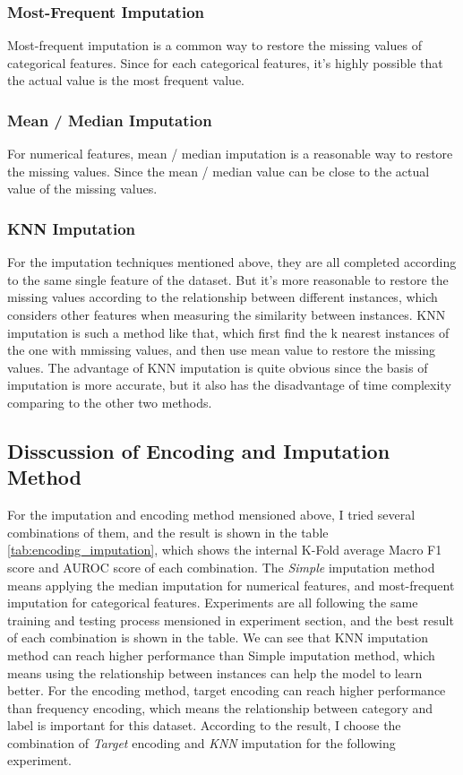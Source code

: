 \documentclass[a4paper, oneside, final, 12pt]{scrartcl} %
\begin{document}
\subsubsection{Most-Frequent Imputation}

Most-frequent imputation is a common way to restore the missing values of categorical features.
Since for each categorical features, it's highly possible that the actual value is the most frequent value.

\subsubsection{Mean / Median Imputation}

For numerical features, mean / median imputation is a reasonable way to restore the missing values.
Since the mean / median value can be close to the actual value of the missing values.

\subsubsection{KNN Imputation}

For the imputation techniques mentioned above, they are all completed according to the same single feature of the dataset.
But it's more reasonable to restore the missing values according to the relationship between different instances,
which considers other features when measuring the similarity between instances.
KNN imputation is such a method like that, which first find the k nearest instances of the one with mmissing values,
and then use mean value to restore the missing values.
The advantage of KNN imputation is quite obvious since the basis of imputation is more accurate,
but it also has the disadvantage of time complexity comparing to the other two methods.

\subsection{Disscussion of Encoding and Imputation Method}

For the imputation and encoding method mensioned above, I tried several combinations of them,
and the result is shown in the table \ref{tab:encoding_imputation}, 
which shows the internal K-Fold average Macro F1 score and AUROC score of each combination.
The \emph{Simple} imputation method means applying the median imputation for numerical features,
and most-frequent imputation for categorical features.
Experiments are all following the same training and testing process mensioned in experiment section,
and the best result of each combination is shown in the table.
We can see that KNN imputation method can reach higher performance than Simple imputation method,
which means using the relationship between instances can help the model to learn better.
For the encoding method, target encoding can reach higher performance than frequency encoding,
which means the relationship between category and label is important for this dataset.
According to the result, I choose the combination of \emph{Target} encoding and \emph{KNN} imputation for the following experiment.
\end{document}
